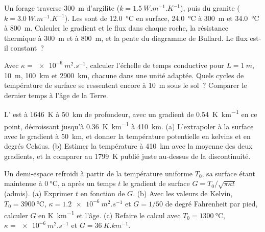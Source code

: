 \begin{exercise}[$\star\star$]\label{exo:b1:heat-budget:6}
Un forage traverse \qty{300}{m} d'argilite ($k = \qty{1.5}{W.m^{-1}.K^{-1}}$), puis
du granite ($k = \qty{3.0}{W.m^{-1}.K^{-1}}$). Les  sont
de \qty{12.0}{\degreeCelsius} en surface, \qty{24.0}{\degreeCelsius} à
\qty{300}{m} et \qty{34.0}{\degreeCelsius} à \qty{800}{m}. Calculer le
gradient et le flux dans chaque roche, la résistance thermique à \qty{300}{m}
et à \qty{800}{m}, et la pente du diagramme de Bullard. Le flux est-il
constant~?
\end{exercise}

\begin{exercise}[$\star\star$]\label{exo:b1:heat-budget:7}
Avec $\kappa = \qty{e-6}{m^2.s^{-1}}$, calculer l'échelle de temps conductive pour
$L = \qty{1}{m}$, \qty{10}{m}, \qty{100}{km} et \qty{2900}{km}, chacune dans une
unité adaptée. Quels cycles de température de surface se ressentent encore à
\qty{10}{m} sous le sol~? Comparer le dernier temps à l'âge de la Terre.
\end{exercise}

\begin{exercise}[$\star\star$]\label{exo:b1:heat-budget:8}
L' est à \qty{1646}{K} à \qty{50}{km} de profondeur, avec un
gradient de \qty{0.54}{K.km^{-1}} en ce point, décroissant jusqu'à
\qty{0.36}{K.km^{-1}} à \qty{410}{km}.
(a) L'extrapoler à la surface avec le gradient à \qty{50}{km}, et donner la
température potentielle en kelvins et en degrés Celsius. (b) Estimer la
température à \qty{410}{km} avec la moyenne des deux gradients, et la comparer
au \qty{1799}{K} publié juste au-dessus de la discontinuité.
\end{exercise}

\begin{exercise}[$\star\star$]\label{exo:b1:heat-budget:9}
Un demi-espace refroidi à partir de la température uniforme $T_0$, sa surface étant
maintenue à $\qty{0}{\degreeCelsius}$, a après un temps $t$ le gradient de surface $G =
T_0/\sqrt{\pi\kappa t}$ (admis). (a) Exprimer $t$ en fonction de $G$. (b) Avec
les valeurs de Kelvin, $T_0 = \qty{3900}{\degreeCelsius}$, $\kappa =
\qty{1.2e-6}{m^2.s^{-1}}$ et $G = 1/50$ de degré Fahrenheit par pied,
calculer $G$ en \unit{K.km^{-1}} et l'âge. (c) Refaire le calcul avec $T_0 =
\qty{1300}{\degreeCelsius}$, $\kappa = \qty{e-6}{m^2.s^{-1}}$ et $G =
\qty{36}{K.km^{-1}}$.
\end{exercise}


